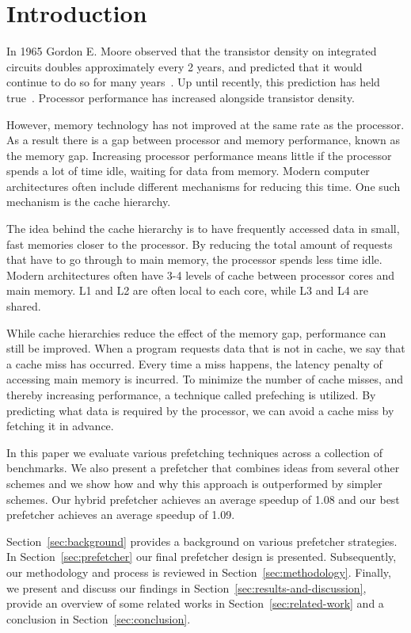 \section{Introduction}
\label{sec:introduction}

In 1965 Gordon E. Moore observed that the transistor density on integrated circuits doubles approximately every 2 years,
and predicted that it would continue to do so for many years~\cite{bib:moore}.
Up until recently, this prediction has held true~\cite{bib:moore-slowdown}.
Processor performance has increased alongside transistor density.

However, memory technology has not improved at the same rate as the processor.
As a result there is a gap between processor and memory performance, known as the memory gap.
Increasing processor performance means little if the processor spends a lot of time idle, waiting for data from memory.
Modern computer architectures often include different mechanisms for reducing this time.
One such mechanism is the cache hierarchy.

The idea behind the cache hierarchy is to have frequently accessed data in small, fast memories closer to the processor.
By reducing the total amount of requests that have to go through to main memory, the processor spends less time idle.
Modern architectures often have 3-4 levels of cache between processor cores and main memory.
L1 and L2 are often local to each core, while L3 and L4 are shared.

While cache hierarchies reduce the effect of the memory gap, performance can still be improved.
When a program requests data that is not in cache, we say that a cache miss has occurred.
Every time a miss happens, the latency penalty of accessing main memory is incurred.
To minimize the number of cache misses, and thereby increasing performance, a technique called prefeching is utilized.
By predicting what data is required by the processor, we can avoid a cache miss by fetching it in advance.

In this paper we evaluate various prefetching techniques across a collection of benchmarks.
We also present a prefetcher that combines ideas from several other schemes and
we show how and why this approach is outperformed by simpler schemes.
Our hybrid prefetcher achieves an average speedup of 1.08 and our best prefetcher achieves an average speedup of 1.09.

Section~\ref{sec:background} provides a background on various prefetcher strategies.
In Section~\ref{sec:prefetcher} our final prefetcher design is presented.
Subsequently, our methodology and process is reviewed in Section~\ref{sec:methodology}.
Finally, we present and discuss our findings in Section~\ref{sec:results-and-discussion}, provide an overview of some related works in Section~\ref{sec:related-work} and a conclusion in Section~\ref{sec:conclusion}.

